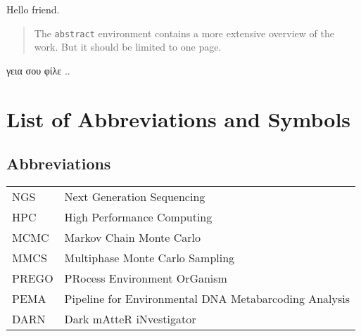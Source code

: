 \documentclass[master=elt,masteroption=eg]{kulemt}
\begin{document}


\begin{preface}
  
   Hello friend.
  
\end{preface}

\tableofcontents*

\begin{abstract}
  The \texttt{abstract} environment contains a more extensive overview of
  the work. But it should be limited to one page.
\end{abstract}


\begin{abstract*}

   γεια σου φίλε ..
   
\end{abstract*}



\listoffiguresandtables


\chapter{List of Abbreviations and Symbols}

\section*{Abbreviations}
\begin{flushleft}
  \renewcommand{\arraystretch}{1.1}
  \begin{tabularx}{\textwidth}{@{}p{12mm}X@{}}
    NGS   & Next Generation Sequencing \\
    HPC   & High Performance Computing \\
    MCMC  & Markov Chain Monte Carlo \\
    MMCS  & Multiphase Monte Carlo Sampling \\
    PREGO & PRocess Environment OrGanism \\
    PEMA  & Pipeline for Environmental DNA Metabarcoding Analysis \\
    DARN  & Dark mAtteR iNvestigator \\
    
  \end{tabularx}
\end{flushleft}
\end{document}
